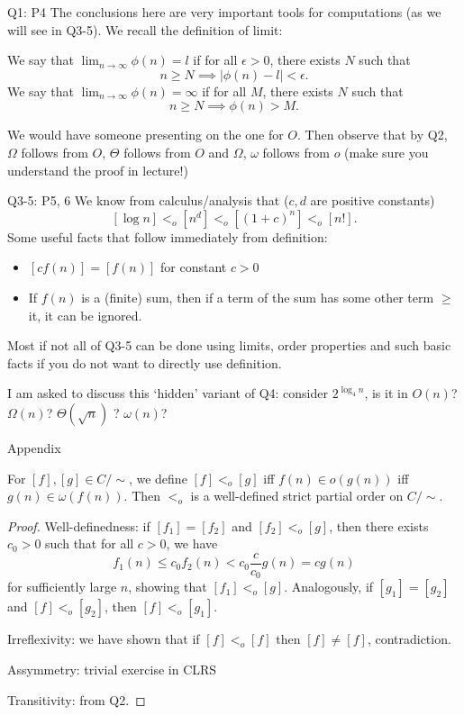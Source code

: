 \documentclass[t]{beamer}
\def\le{\leqslant}
\def\ge{\geqslant}
\begin{document}
\begin{frame}{Q1: P4}
  The conclusions here are very important tools for computations (as we will see in Q3-5). We recall the definition of limit:
  \begin{definition}
    We say that $\lim_{n \to \infty}\phi(n) = l$ if for all $\epsilon>0$, there exists $N$ such that
    \[n \ge N \implies |\phi(n)-l|<\epsilon.\]
    We say that $\lim_{n \to \infty}\phi(n) = \infty$ if for all $M$, there exists $N$ such that
    \[n \ge N \implies \phi(n)>M.\]
  \end{definition}
  We would have someone presenting on the one for $O$. Then observe that by Q2, $\Omega$ follows from $O$, $\Theta$ follows from $O$ and $\Omega$, $\omega$ follows from $o$ (make sure you understand the proof in lecture!)
\end{frame}
\begin{frame}{Q3-5: P5, 6}
  We know from calculus/analysis that ($c, d$ are positive constants)
  \[[\log{n}] <_o [n^d] <_o [(1+c)^n] <_o [n!].\]
  Some useful facts that follow immediately from definition:
  \begin{itemize}
    \item $[cf(n)] = [f(n)]$ for constant $c>0$
    \item If $f(n)$ is a (finite) sum, then if a term of the sum has some other term $\ge$ it, it can be ignored. 
  \end{itemize}
  Most if not all of Q3-5 can be done using limits, order properties and such basic facts if you do not want to directly use definition. 
  \par I am asked to discuss this `hidden' variant of Q4: consider $2^{\log_4{n}}$, is it in $O(n)$? $\Omega(n)$? $\Theta(\sqrt{n})$ ? $\omega(n)$?
\end{frame}
\begin{frame}{Appendix}
  \begin{theorem}
    For $[f], [g] \in C/{\sim}$, we define $[f] <_o [g]$ iff $f(n) \in o(g(n))$ iff $g(n) \in \omega(f(n))$. Then $<_o$ is a well-defined strict partial order on $C/{\sim}$. 
  \end{theorem}
  \begin{proof}
    Well-definedness: if $[f_1]=[f_2]$ and $[f_2] <_o [g]$, then there exists $c_0>0$ such that for all $c>0$, we have
    \[f_1(n) \le c_0f_2(n) < c_0\frac{c}{c_0}g(n)=cg(n)\]
    for sufficiently large $n$, showing that $[f_1] <_o [g]$. Analogously, if $[g_1]=[g_2]$ and $[f] <_o [g_2]$, then $[f] <_o [g_1]$. 
    \par Irreflexivity: we have shown that if $[f] <_o [f]$ then $[f] \ne [f]$, contradiction. 
    \par Assymmetry: trivial exercise in CLRS
    \par Transitivity: from Q2.
  \end{proof}
\end{frame}
\end{document}
